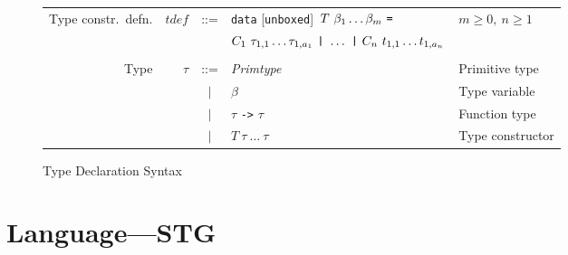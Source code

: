 \documentclass[11pt]{article}
\begin{document}
\setlength{\tabcolsep}{5pt}
\begin{figure}
\centering
\footnotesize %
\begin{tabular}{r r c l l}
  Type constr.\ defn. &  $\mathit{tdef}$ & ::= & \texttt{data} [\texttt{unboxed}]\ 
  $T\ \beta_1 \dots \beta_m\ \mbox{\texttt{=}} $ & $m \ge 0,\ n \ge 1$\\
  & & & \quad $C_1\ \tau_{1,1} \dots \tau_{1,a_1}\ \mbox{\texttt{|}}\ \dots\ \mbox{\texttt{|}}\ C_n\ t_{1,1} \dots t_{1,a_n}  $ \\
\\
Type               & $\tau$           & ::= & \emph{Primtype}           & Primitive type\\
                   &                  & $|$ & $\beta$                   & Type variable \\
                   &                  & $|$ & $\tau$ \texttt{->} $\tau$ & Function type \\
                   &                  & $|$ & $T\ \tau\ \dots\ \tau$    & Type constructor\\
\end{tabular}
\caption{Type Declaration Syntax}
\label{fig:typedecsyntax}
\end{figure}

\section{Language---STG}
\end{document}
